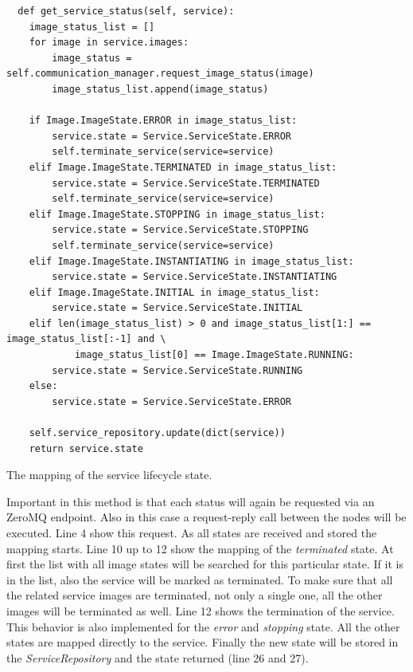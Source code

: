 \begin{listing}[H]
  \begin{verbatim}
  def get_service_status(self, service):
    image_status_list = []
    for image in service.images:
        image_status = self.communication_manager.request_image_status(image)
        image_status_list.append(image_status)

    if Image.ImageState.ERROR in image_status_list:
        service.state = Service.ServiceState.ERROR
        self.terminate_service(service=service)
    elif Image.ImageState.TERMINATED in image_status_list:
        service.state = Service.ServiceState.TERMINATED
        self.terminate_service(service=service)
    elif Image.ImageState.STOPPING in image_status_list:
        service.state = Service.ServiceState.STOPPING
        self.terminate_service(service=service)
    elif Image.ImageState.INSTANTIATING in image_status_list:
        service.state = Service.ServiceState.INSTANTIATING
    elif Image.ImageState.INITIAL in image_status_list:
        service.state = Service.ServiceState.INITIAL
    elif len(image_status_list) > 0 and image_status_list[1:] == image_status_list[:-1] and \
            image_status_list[0] == Image.ImageState.RUNNING:
        service.state = Service.ServiceState.RUNNING
    else:
        service.state = Service.ServiceState.ERROR

    self.service_repository.update(dict(service))
    return service.state
  \end{verbatim}
  \caption{The mapping of the service lifecycle state.}
  \label{code:service-state-lifecycle}
\end{listing}

Important in this method is that each status will again be requested via an ZeroMQ endpoint.
Also in this case a request-reply call between the nodes will be executed.
Line 4 show this request.
As all states are received and stored the mapping starts.
Line 10 up to 12 show the mapping of the \textit{terminated} state.
At first the list with all image states will be searched for this particular state.
If it is in the list, also the service will be marked as terminated.
To make sure that all the related service images are terminated, not only a single one, all the other images will be terminated as well.
Line 12 shows the termination of the service.
This behavior is also implemented for the \textit{error} and \textit{stopping} state.
All the other states are mapped directly to the service.
Finally the new state will be stored in the \textit{ServiceRepository} and the state returned (line 26 and 27).

